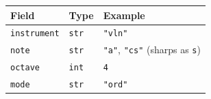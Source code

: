 \documentclass[
  10pt,
]{article}
\begin{document}
\begin{longtable}[]{@{}lll@{}}
\toprule
\begin{minipage}[b]{0.30\columnwidth}\raggedright
Field\strut
\end{minipage} &
\begin{minipage}[b]{0.30\columnwidth}\raggedright
Type\strut
\end{minipage} &
\begin{minipage}[b]{0.30\columnwidth}\raggedright
Example\strut
\end{minipage}\tabularnewline
\midrule
\endhead
\begin{minipage}[t]{0.30\columnwidth}\raggedright
\texttt{instrument}\strut
\end{minipage} &
\begin{minipage}[t]{0.30\columnwidth}\raggedright
\texttt{str}\strut
\end{minipage} &
\begin{minipage}[t]{0.30\columnwidth}\raggedright
\texttt{"vln"}\strut
\end{minipage}\tabularnewline
\begin{minipage}[t]{0.30\columnwidth}\raggedright
\texttt{note}\strut
\end{minipage} &
\begin{minipage}[t]{0.30\columnwidth}\raggedright
\texttt{str}\strut
\end{minipage} &
\begin{minipage}[t]{0.30\columnwidth}\raggedright
\texttt{"a"}, \texttt{"cs"} (sharps as \texttt{s})\strut
\end{minipage}\tabularnewline
\begin{minipage}[t]{0.30\columnwidth}\raggedright
\texttt{octave}\strut
\end{minipage} &
\begin{minipage}[t]{0.30\columnwidth}\raggedright
\texttt{int}\strut
\end{minipage} &
\begin{minipage}[t]{0.30\columnwidth}\raggedright
\texttt{4}\strut
\end{minipage}\tabularnewline
\begin{minipage}[t]{0.30\columnwidth}\raggedright
\texttt{mode}\strut
\end{minipage} &
\begin{minipage}[t]{0.30\columnwidth}\raggedright
\texttt{str}\strut
\end{minipage} &
\begin{minipage}[t]{0.30\columnwidth}\raggedright
\texttt{"ord"}\strut

\end{minipage}
\end{longtable}
\end{document}
